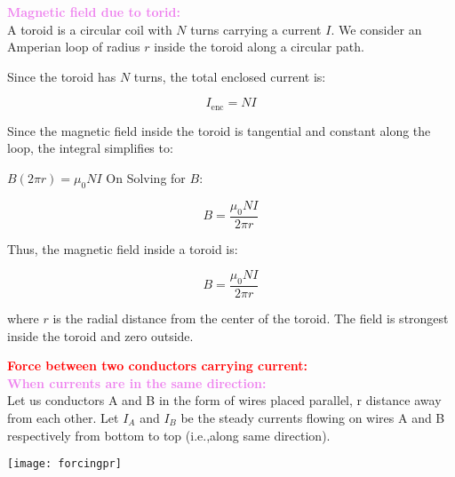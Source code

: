 \documentclass{beamer}
\begin{document}
\begin{frame}
\textcolor{violet}{\textbf{Magnetic field due to torid:}}\\
A toroid is a circular coil with \( N \) turns carrying a current \( I \). We consider an Amperian loop of radius \( r \) inside the toroid along a circular path.

Since the toroid has \( N \) turns, the total enclosed current is:

\begin{equation}
I_{\text{enc}} = N I
\end{equation}

Since the magnetic field inside the toroid is tangential and constant along the loop, the integral simplifies to:


$B (2\pi r) = \mu_0 N I$ On Solving for \( B \):

\[
B = \frac{\mu_0 N I}{2\pi r}
\]


Thus, the magnetic field inside a toroid is:

\[
B = \frac{\mu_0 N I}{2\pi r}
\]

where \( r \) is the radial distance from the center of the toroid. The field is strongest inside the toroid and zero outside.

\end{frame} 


 
\begin{frame}
\textcolor{red}{\textbf{Force between two conductors carrying current:}}\\
\textcolor{violet}{\textbf{When currents are in the same direction:}}\\
Let us conductors A and B in the form of wires placed parallel, r distance away from each other. Let $I_A$ and $I_B$ be the steady currents flowing on wires A and B respectively from bottom to top (i.e.,along same direction).
\begin{center}
\texttt{[image: forcingpr]}
\end{center}

\end{frame} 
 
\end{document}

